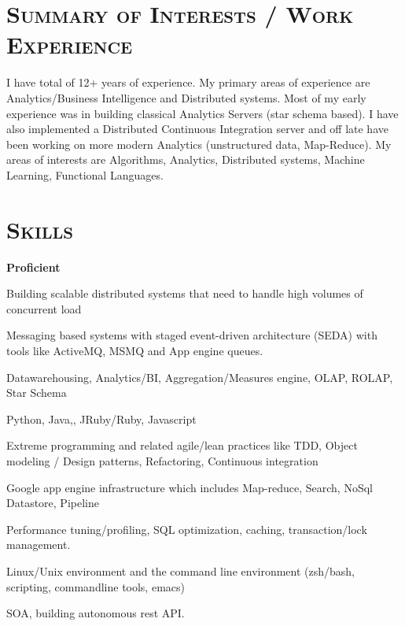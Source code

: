 \address{twitter: \_rags \hspace{15mm} \ \ github: \url{http://goo.gl/ByJXtT}  \ \  linkedin: \url{http://goo.gl/iaxYPm}  }
\begin{resume}




\section{\textsc{Summary of Interests / Work Experience}}
I have total of 12+ years of experience. My primary areas of experience are Analytics/Business Intelligence and Distributed systems. Most of my early experience was in building classical Analytics Servers (star schema based). I have also implemented a Distributed Continuous Integration server and off late have been working on more modern Analytics (unstructured data, Map-Reduce). My areas of interests are Algorithms, Analytics, Distributed systems, Machine Learning, Functional Languages.

\section{\textsc{Skills}} 
{\textbf{Proficient}}
\begin{mylist}
  \item Building scalable distributed systems that need to handle high volumes of concurrent load
  \item Messaging based systems with staged event-driven architecture (SEDA) with tools like ActiveMQ, MSMQ and App engine queues.
  \item Datawarehousing, Analytics/BI, Aggregation/Measures engine, OLAP, ROLAP, Star Schema
  \item Python, Java,\CSharp, JRuby/Ruby, Javascript
  \item Extreme programming and related agile/lean practices like TDD, Object modeling / Design patterns, Refactoring, Continuous integration
  \item Google app engine infrastructure which includes Map-reduce, Search, NoSql Datastore, Pipeline
  \item Performance tuning/profiling, SQL optimization, caching, transaction/lock management.
  \item Linux/Unix environment and the command line environment (zsh/bash, scripting, commandline tools, emacs)
 \item SOA, building autonomous rest API.


\end{mylist}
\end{resume}
